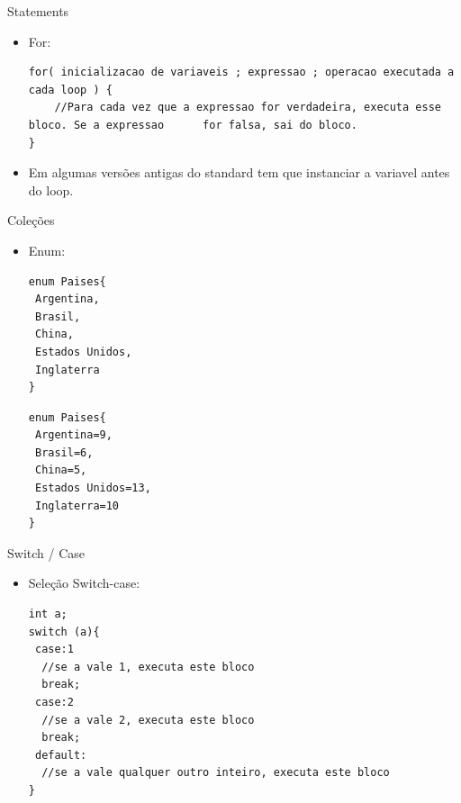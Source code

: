 \documentclass[12pt,table,xcolor={dvipsnames}]{beamer}
\begin{document}
\begin{frame}[fragile]{Statements}

\begin{itemize}
\item For:
\begin{lstlisting}
for( inicializacao de variaveis ; expressao ; operacao executada a cada loop ) {
	//Para cada vez que a expressao for verdadeira, executa esse bloco. Se a expressao      for falsa, sai do bloco.
}
\end{lstlisting}
\item Em algumas versões antigas do standard tem que instanciar a variavel antes do loop.
\end{itemize}
\end{frame}

\begin{frame}[fragile]{Coleções}

\begin{itemize}
\item Enum:
\begin{lstlisting}
enum Paises{
 Argentina,
 Brasil,
 China,
 Estados Unidos,
 Inglaterra
}
\end{lstlisting}
\begin{lstlisting}
enum Paises{
 Argentina=9,
 Brasil=6,
 China=5,
 Estados Unidos=13,
 Inglaterra=10
}
\end{lstlisting}
\end{itemize}
\end{frame}

\begin{frame}[fragile]{Switch / Case}

\begin{itemize}
\item Seleção Switch-case:
\begin{lstlisting}
int a;
switch (a){
 case:1
  //se a vale 1, executa este bloco
  break;
 case:2
  //se a vale 2, executa este bloco
  break;
 default:
  //se a vale qualquer outro inteiro, executa este bloco
}
\end{lstlisting}
\end{itemize}
\end{frame}
\end{document}
